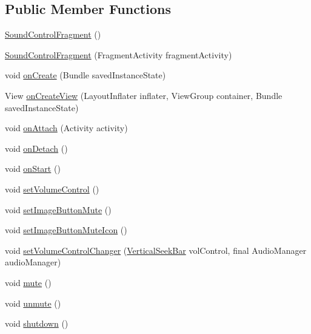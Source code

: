 \subsection*{Public Member Functions}
\begin{DoxyCompactItemize}
\item 
\hyperlink{classpt_1_1lsts_1_1asa_1_1fragments_1_1SoundControlFragment_a0acb60837e9cf56352656e4cdc5bd6e2}{Sound\+Control\+Fragment} ()
\item 
\hyperlink{classpt_1_1lsts_1_1asa_1_1fragments_1_1SoundControlFragment_a8f5e0b61e08783b09ecdf00bcb2bde89}{Sound\+Control\+Fragment} (Fragment\+Activity fragment\+Activity)
\item 
void \hyperlink{classpt_1_1lsts_1_1asa_1_1fragments_1_1SoundControlFragment_adddc5cf9e8cd68ab4f72f203a1ccd97d}{on\+Create} (Bundle saved\+Instance\+State)
\item 
View \hyperlink{classpt_1_1lsts_1_1asa_1_1fragments_1_1SoundControlFragment_a415103cd0c1c5033974f3429022a85e6}{on\+Create\+View} (Layout\+Inflater inflater, View\+Group container, Bundle saved\+Instance\+State)
\item 
void \hyperlink{classpt_1_1lsts_1_1asa_1_1fragments_1_1SoundControlFragment_a37e0622e960391ece262fa6c576e144d}{on\+Attach} (Activity activity)
\item 
void \hyperlink{classpt_1_1lsts_1_1asa_1_1fragments_1_1SoundControlFragment_aa2b01007ed894ab46f24c3e96c90e323}{on\+Detach} ()
\item 
void \hyperlink{classpt_1_1lsts_1_1asa_1_1fragments_1_1SoundControlFragment_add408be2e604a2dfa75f3ccd3c7f1da0}{on\+Start} ()
\item 
void \hyperlink{classpt_1_1lsts_1_1asa_1_1fragments_1_1SoundControlFragment_a95f758e16b260462b8460e39430cc2e2}{set\+Volume\+Control} ()
\item 
void \hyperlink{classpt_1_1lsts_1_1asa_1_1fragments_1_1SoundControlFragment_a99c0abd79e534853c8864980ad5b1761}{set\+Image\+Button\+Mute} ()
\item 
void \hyperlink{classpt_1_1lsts_1_1asa_1_1fragments_1_1SoundControlFragment_ab8d4bd7ff9c3d48a6ed8df6fe6447ad1}{set\+Image\+Button\+Mute\+Icon} ()
\item 
void \hyperlink{classpt_1_1lsts_1_1asa_1_1fragments_1_1SoundControlFragment_a07bdc3dea292c4d5253397afc043d8c7}{set\+Volume\+Control\+Changer} (\hyperlink{classpt_1_1lsts_1_1asa_1_1ui_1_1components_1_1VerticalSeekBar}{Vertical\+Seek\+Bar} vol\+Control, final Audio\+Manager audio\+Manager)
\item 
void \hyperlink{classpt_1_1lsts_1_1asa_1_1fragments_1_1SoundControlFragment_aa4afb989986ef623aef6e4038f4d7a49}{mute} ()
\item 
void \hyperlink{classpt_1_1lsts_1_1asa_1_1fragments_1_1SoundControlFragment_a44c96cb9d4e32353413320aaf348435b}{unmute} ()
\item 
void \hyperlink{classpt_1_1lsts_1_1asa_1_1fragments_1_1SoundControlFragment_a9e05534cb6c3e319966b3d38e1433440}{shutdown} ()
\end{DoxyCompactItemize}
